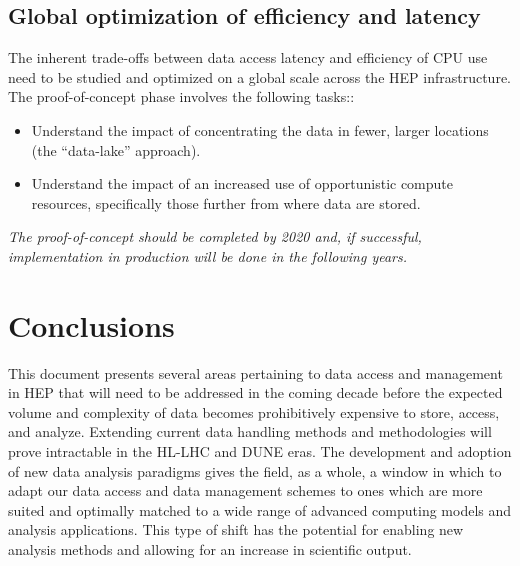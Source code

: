 \documentclass[12pt,a4paper]{article}
\begin{document}
\subsection{Global optimization of efficiency and latency}\label{efficiency-latency}
The inherent trade-offs between data access latency and efficiency of CPU use need to be studied and optimized
on a global scale across the HEP infrastructure. The proof-of-concept phase involves the following tasks::

\begin{itemize}
\item Understand the impact of concentrating the
  data in fewer, larger locations (the ``data-lake'' approach).
\item Understand the impact of an increased use of
  opportunistic compute resources, specifically those further from where data are stored.
\end{itemize}

\emph{The  proof-of-concept should be completed by 2020 and, if successful, implementation in
production will be done in the following years.}

\section{Conclusions}\label{conclusions}

This document presents several
areas pertaining to data access and management in HEP that will need to
be addressed in the coming decade before the expected volume and
complexity of data becomes prohibitively expensive to store, access, and
analyze. Extending current data handling methods and methodologies will
prove intractable in the HL-LHC and DUNE eras. The development and
adoption of new data analysis paradigms gives the field, as a whole, a
window in which to adapt our data access and data management schemes to
ones which are more suited and optimally matched to a wide range of
advanced computing models and analysis applications. This type of shift
has the potential for enabling new analysis methods and allowing for an
increase in scientific output.


\sloppy
\raggedright
\clearpage
\printbibliography[title={References},heading=bibintoc]
\end{document}
